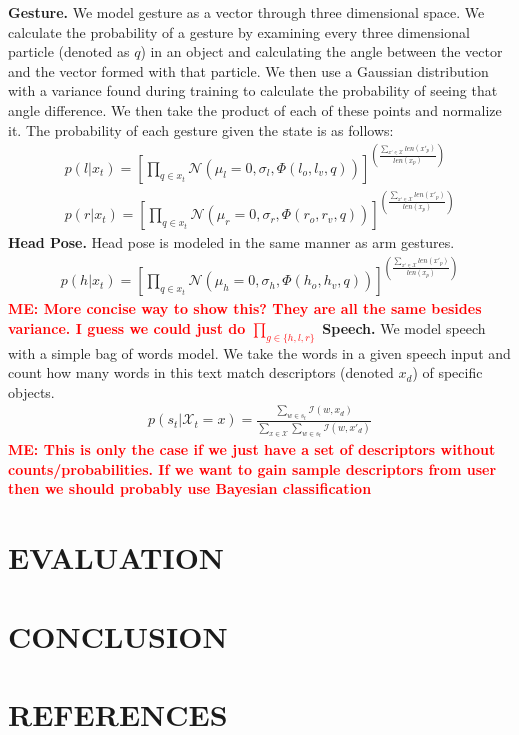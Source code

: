 \documentclass[letterpaper, 10 pt, conference]{ieeeconf}
\newcommand{\menote}[1]{\textcolor{Red}{\textbf{ME: #1}}}
\begin{document}
{\bf Gesture.}  We model gesture as a vector through three dimensional space. We calculate the probability of a gesture by examining every three dimensional particle (denoted as $q$) in an object and calculating the angle between the vector and the vector formed with that particle. We then use a Gaussian distribution with a  variance found during training to calculate the probability of seeing that angle difference. We then take the product of each of these points and normalize it. The probability of each gesture given the state is as follows:
\begin{align}
p(l|x_t) = [\displaystyle \prod_{q \in x_t} \mathcal{N}(\mu_l=0, \sigma_l, \Phi(l_o,l_v, q))]^{(\frac{\sum_{x'\in\mathcal{X}} len(x'_p)}{len(x_p)})}\\
p(r|x_t) = [\displaystyle \prod_{q \in x_t} \mathcal{N}(\mu_r=0, \sigma_r, \Phi(r_o,r_v, q))]^{(\frac{\sum_{x'\in\mathcal{X}} len(x'_p)}{len(x_p)})}
\end{align}
{\bf Head Pose.}
Head pose is modeled in the same manner as arm gestures.
\begin{align}
p(h|x_t) = [\displaystyle \prod_{q \in x_t} \mathcal{N}(\mu_h=0, \sigma_h, \Phi(h_o,h_v, q))]^{(\frac{\sum_{x'\in\mathcal{X}} len(x'_p)}{len(x_p)})}
\end{align}
\menote{More concise way to show this? They are all the same besides variance. I guess we could just do $\prod_{g\in\{h,l,r\}}$}
{\bf Speech.}
We model speech with a simple bag of words model. We take the words in a given speech input and count how many words in this text match descriptors (denoted  $x_d$) of specific objects.
\begin{align}
p(s_t |\mathcal{X}_t=x) = \frac{\displaystyle\sum_{w\in s_{t}} \mathcal{I}(w, x_d)}{\displaystyle\sum_{x \in \mathcal{X}}\sum_{w\in s_{t}} \mathcal{I}(w, x'_d)}
\end{align}
\menote{This is only the case if we just have a set of descriptors without counts/probabilities. If we want to gain sample descriptors from user then we should probably use Bayesian classification}


\section{EVALUATION}

\section{CONCLUSION}

\section{REFERENCES}


\end{document}
